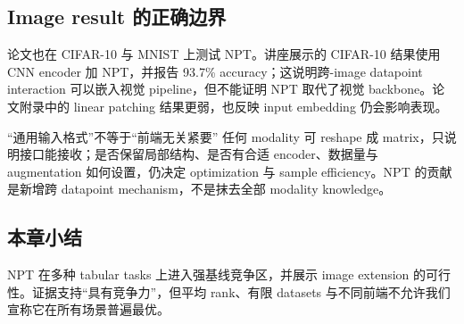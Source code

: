 \subsection{Image result 的正确边界}

论文也在 CIFAR-10 与 MNIST 上测试 NPT。讲座展示的 CIFAR-10 结果使用 CNN encoder 加 NPT，并报告 93.7\% accuracy；这说明跨-image datapoint interaction 可以嵌入视觉 pipeline，但不能证明 NPT 取代了视觉 backbone。论文附录中的 linear patching 结果更弱，也反映 input embedding 仍会影响表现。

\begin{warningbox}{“通用输入格式”不等于“前端无关紧要”}
任何 modality 可 reshape 成 matrix，只说明接口能接收；是否保留局部结构、是否有合适 encoder、数据量与 augmentation 如何设置，仍决定 optimization 与 sample efficiency。NPT 的贡献是新增跨 datapoint mechanism，不是抹去全部 modality knowledge。
\end{warningbox}

\subsection{本章小结}

NPT 在多种 tabular tasks 上进入强基线竞争区，并展示 image extension 的可行性。证据支持“具有竞争力”，但平均 rank、有限 datasets 与不同前端不允许我们宣称它在所有场景普遍最优。

